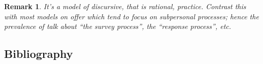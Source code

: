 \documentclass[11pt,twoside]{article}
\newtheorem{remark}{Remark}
\begin{document}
\begin{remark}
  It's a model of discursive, that is rational, practice.  Contrast
  this with most models on offer which tend to focus on subpersonal
  processes; hence the prevalence of talk about ``the survey
  process'', the ``response process'', etc.
\end{remark}



\clearpage
\appendix
\begin{appendices}
\section{Bibliography}
\printbibliography[heading=none]
\end{appendices}
\end{document}
